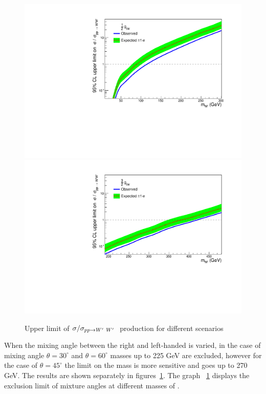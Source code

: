 \begin{figure}[!htb]
  \hspace{3mm}
  \includegraphics*[width=.45\textwidth]{figs/mixHalvedb.pdf}
  \hspace{3mm}
  \includegraphics*[width=.45\textwidth]{figs/mix3Over2b.pdf}
  \caption{Upper limit of $\sigma/\sigma_{pp \rightarrow W^\prime~ W^\prime~}$ production for different scenarios}
  \label{fig:brazilianFlags}
\end{figure}

When the mixing angle between the right and left-handed \wprime is varied, in the case of mixing angle $\theta=30^\circ$ and $\theta=60^\circ$ masses up to 225 GeV are excluded, however for the case of $\theta=45^\circ$ the limit on the mass is more sensitive and goes up to 270 GeV. The results are shown separately in figures~\ref{fig:brazilianFlags}. The graph ~\ref{fig:brazilianFlags} displays the exclusion limit of mixture angles at different masses of \wprime.

 

